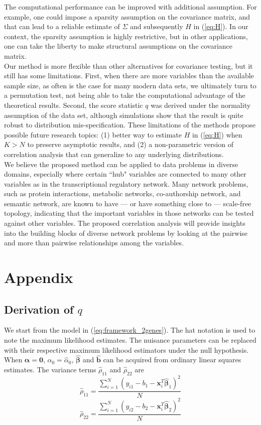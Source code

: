 \documentclass[aoas,preprint]{imsart}
\numberwithin{equation}{section}
\theoremstyle{plain}
\begin{document}
The computational performance can be improved with additional assumption. For example, one could impose a sparsity assumption on the covariance matrix, and that can lead to a reliable estimate of $\Sigma$ and subsequently $H$ in (\ref{eq:H}). In our context, the sparsity assumption is highly restrictive, but in other applications, one can take the liberty to make structural assumptions on the covariance matrix.  \\

Our method is more flexible than other alternatives for covariance testing, but it still has some limitations. First, when there are more variables than the available sample size, as often is the case for many modern data sets, we ultimately turn to a permutation test, not being able to take the computational advantage of the theoretical results. Second, the score statistic $q$ was derived under the normality assumption of the data set, although simulations show that the result is quite robust to distribution mis-specification. These limitations of the methods propose possible future research topics: (1) better way to estimate $H$ in (\ref{eq:H}) when $K > N$ to preserve asymptotic results, and (2) a non-parametric version of correlation analysis that can generalize to any underlying distributions. \\

We believe the proposed method can be applied to data problems in diverse domains, especially where certain ``hub" variables are connected to many other variables as in the transcriptional regulatory network. Many network problems, such as protein interactions, metabolic networks, co-authorship network, and semantic network, are known to have --- or have something close to --- scale-free topology, indicating that the important variables in those networks can be tested against other variables. The proposed correlation analysis will provide insights into the building blocks of diverse network problems by looking at the pairwise and more than pairwise relationships among the variables.
 

 
 \pagebreak
 
\section{Appendix}
\subsection{Derivation of $q$}
We start from the model in (\ref{eq:framework_2genes}). The hat notation is used to note the maximum likelihood estimates. The nuisance parameters can be replaced with their respective maximum likelihood estimators under the null hypothesis. When $\bm{\alpha} = \bm{0}$, $\alpha_0 = \hat{\alpha}_0$, $\hat{\bm{\beta}}$ and $\hat{\bm{b}}$ can be acquired from ordinary linear squares estimates. The variance terms $\hat{\rho}_{11}$ and $\hat{\rho}_{22}$ are
$$\hat{\rho}_{11} =  \frac{\sum_{i=1}^{N}(y_{i1} - b_1 - \bm{x}_i^T\bm{\hat{\beta}}_{1})^2}{N}$$
$$\hat{\rho}_{22}=  \frac{\sum_{i=1}^{N}(y_{i2} - b_2 - \bm{x}_i^T\bm{\hat{\beta}}_{2})^2}{N}$$
\end{document}
